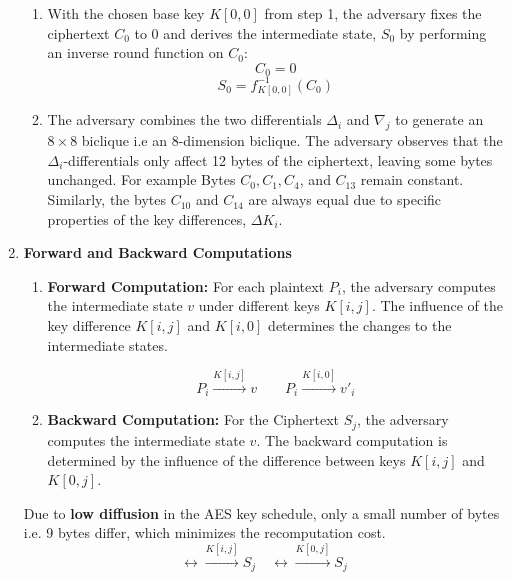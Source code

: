 \documentclass{report}
\begin{document}
\begin{enumerate}[start = 1, label={(\bfseries Step\arabic*):}]
    \begin{enumerate}
        \item With the chosen base key $K[0,0]$ from step 1, the adversary fixes the ciphertext $C_0$ to 0 and derives the intermediate state, $S_0$ by performing an inverse round function on $C_0$:
        \begin{equation}
        C_0 = 0 
        \end{equation}
        \begin{equation}
        S_0 = f_{K[0,0]}^{-1}(C_0)
        \end{equation}
    
        \item The adversary combines the two differentials $\Delta_i$ and $\nabla_j$ to generate an $8 \times 8$ biclique i.e an 8-dimension biclique. The adversary observes that the $\Delta_i$-differentials only affect 12 bytes of the ciphertext, leaving some bytes unchanged. For example Bytes $C_0, C_1, C_4$, and $C_{13}$ remain constant. Similarly, the bytes $C_{10}$ and $C_{14}$ are always equal due to specific properties of the key differences, $\Delta K_i$.
    \end{enumerate}

    \item \textbf{Forward and Backward Computations}\\
    \begin{enumerate}
        \item \textbf{Forward Computation:} For each plaintext $P_i$, the adversary computes the intermediate state $v$ under different keys $K[i,j]$. The influence of the key difference $K[i,j]$ and $K[i,0]$ determines the changes to the intermediate states.
        
        \begin{equation}
            P_i \xrightarrow{K[i,j]} v \quad \quad P_i \xrightarrow{K[i,0]} v'_i
        \end{equation}
    
        \item \textbf{Backward Computation:} For the Ciphertext $S_j$, the adversary computes the intermediate state $v$. The backward computation is determined by the influence of the difference between keys $K[i,j]$ and $K[0,j]$.
        
    \end{enumerate}
    Due to \textbf{low diffusion} in the AES key schedule, only a small number of bytes i.e. 9 bytes differ, which minimizes the recomputation cost.
\begin{equation}
    \leftrightarrow \xrightarrow{K[i,j]} S_j \quad \leftrightarrow \xrightarrow{K[0,j]} S_j
\end{equation}


\end{enumerate}
\end{document}
